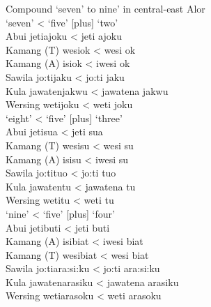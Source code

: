 \documentclass[output=paper]{LSP/langsci}
\begin{document}
\ea%
\label{ex:6:6}
Compound `seven' to nine' in central-east Alor\\
\ea
\glllllll   { }    `seven'      {\textless}  `five'  		[plus]  `two' \\
Abui    {jeti}{{\ng}}{ajoku}    {\textless}  {jeti}{{\ng}} 	{}   {ajoku}\\
Kamang{ }(T)  {wesi}{{\ng}}{ok} {\textless}  {wesi}{{\ng}}   	{} {ok}\\
Kamang{ }(A)  {isi{\ng}ok}      {\textless}  {iwesi{\ng}}  	{}  {ok}\\
Sawila    {jo:ti{\ng}jaku}     {\textless}  {jo:ti{\ng}} 	{}   {jaku}\\
Kula    {jawatenjakwu}    	{\textless}  {jawatena} 	{} {jakwu}\\
Wersing  {weti{\ng}joku}    {\textless}  {weti{\ng}} 		{}   {joku}\\
\ex 
\glllllll    { } `eight'      {\textless}  `five'  	[plus]  `three'\\
Abui    {jeti}{{\ng}}{sua}    {\textless}  {jeti{\ng}} 	{} {sua}\\
Kamang{ }(T)  {wesi{\ng}su}    {\textless}  {wesi{\ng}} {}  {su}\\
Kamang{ }(A)  {isi{\ng}su}      {\textless}  {iwesi{\ng}} {}  {su}\\
Sawila    {jo:ti{\ng}tuo}     {\textless}  {jo:ti{\ng}}  {}  {tuo}\\
Kula    {jawatentu}   		{\textless} {jawatena} 	{} {tu}\\
Wersing  {weti{\ng}tu}      {\textless}  {weti{\ng}} 	{}   {tu}\\
\ex   
\glllllll    { }   `nine'      {\textless}  `five'  	[plus]  `four' \\
Abui    {jeti}{{\ng}}{buti}    {\textless}  {jeti{\ng}}  {}    {buti}\\
Kamang{ }(A)  {isi{\ng}biat}   {\textless}  {iwesi{\ng}}  {}  {biat}\\
Kamang{ }(T)  {wesi{\ng}biat}  {\textless}  {wesi{\ng}}  {}  {biat}\\
Sawila    {jo:ti{\ng}ara:si:ku} {\textless}  {jo:ti{\ng}}  {}  {ara:si:ku}\\
Kula    {jawatenarasiku}  	{\textless}  {jawatena}  {}  {arasiku}\\
Wersing  {weti{\ng}arasoku}    {\textless}  {weti{\ng}}   {}   {arasoku}\\
\z
\z
\end{document}
